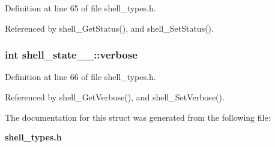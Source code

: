 Definition at line 65 of file shell\_\-types.h.

Referenced by shell\_\-Get\-Status(), and shell\_\-Set\-Status().
\subsubsection{\setlength{\rightskip}{0pt plus 5cm}int {\bf shell\_\-state\_\-\_\-::verbose}}\label{structshell__state_____o4}




Definition at line 66 of file shell\_\-types.h.

Referenced by shell\_\-Get\-Verbose(), and shell\_\-Set\-Verbose().

The documentation for this struct was generated from the following file:\begin{CompactItemize}
\item 
{\bf shell\_\-types.h}\end{CompactItemize}
